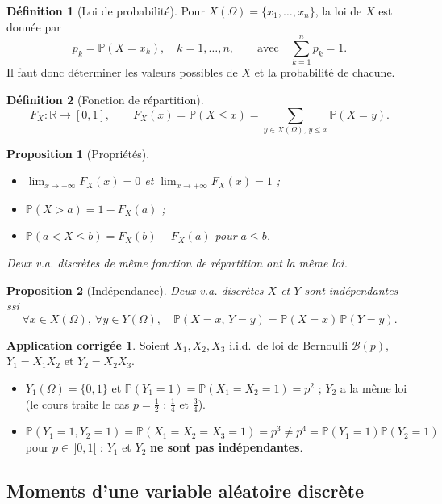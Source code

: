 \documentclass[11pt,a4paper]{article}
\renewcommand{\P}{\mathbb{P}}
\newcommand{\R}{\mathbb{R}}
\newcommand{\1}{\mathbf{1}}
\theoremstyle{definition}
\newtheorem*{definition}{Définition}
\newtheorem*{application}{Application corrigée}
\theoremstyle{plain}
\newtheorem*{proposition}{Proposition}
\theoremstyle{remark}
\begin{document}
\begin{definition}[Loi de probabilité]
Pour $X(\Omega)=\{x_1,\dots,x_n\}$, la loi de $X$ est donnée par
\[
p_k=\P(X=x_k),\quad k=1,\dots,n,\qquad\text{avec}\quad\sum_{k=1}^{n}p_k=1.
\]
Il faut donc déterminer les valeurs possibles de $X$ et la probabilité de chacune.
\end{definition}

\begin{definition}[Fonction de répartition]
\[
F_X:\R\to[0,1],\qquad F_X(x)=\P(X\le x)=\sum_{y\in X(\Omega),\,y\le x}\P(X=y).
\]
\end{definition}

\begin{proposition}[Propriétés]
\begin{itemize}
  \item $\displaystyle\lim_{x\to-\infty}F_X(x)=0$ et $\displaystyle\lim_{x\to+\infty}F_X(x)=1$ ;
  \item $\P(X>a)=1-F_X(a)$ ;
  \item $\P(a<X\le b)=F_X(b)-F_X(a)$ pour $a\le b$.
\end{itemize}
Deux v.a. discrètes de même fonction de répartition ont la même loi.
\end{proposition}

\begin{proposition}[Indépendance]
Deux v.a. discrètes $X$ et $Y$ sont indépendantes ssi
\[
\forall x\in X(\Omega),\ \forall y\in Y(\Omega),\quad \P(X=x,\,Y=y)=\P(X=x)\,\P(Y=y).
\]
\end{proposition}

\begin{application}
Soient $X_1,X_2,X_3$ i.i.d.\ de loi de Bernoulli $\mathcal{B}(p)$, $Y_1=X_1X_2$ et $Y_2=X_2X_3$.
\begin{itemize}
  \item $Y_1(\Omega)=\{0,1\}$ et $\P(Y_1=1)=\P(X_1=X_2=1)=p^2$ ; $Y_2$ a la même loi (le cours traite le cas $p=\tfrac12$ : $\tfrac14$ et $\tfrac34$).
  \item $\P(Y_1=1,Y_2=1)=\P(X_1=X_2=X_3=1)=p^3\neq p^4=\P(Y_1=1)\P(Y_2=1)$ pour $p\in\,]0,1[$ : $Y_1$ et $Y_2$ \textbf{ne sont pas indépendantes}.
\end{itemize}
\end{application}

\subsection{Moments d'une variable aléatoire discrète}
\end{document}
